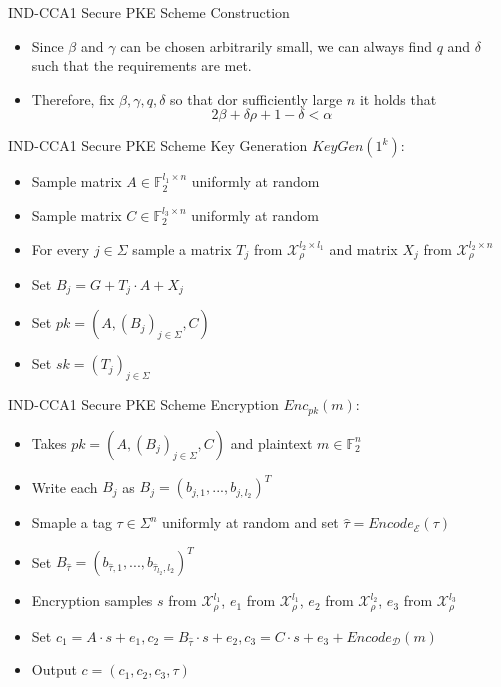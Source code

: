 \documentclass{beamer}
\begin{document}
\begin{frame}{IND-CCA1 Secure PKE Scheme Construction}
  \begin{itemize}
    \item Since $\beta$ and $\gamma$ can be chosen arbitrarily small, we can always find $q$ and $\delta$ such that the requirements are met.
    \item Therefore, fix $\beta, \gamma, q, \delta$ so that dor sufficiently large $n$ it holds that
          $$ 2\beta + \delta \rho + 1 - \delta < \alpha $$
  \end{itemize}
\end{frame}


\begin{frame}{IND-CCA1 Secure PKE Scheme Key Generation}
  $KeyGen(1^k)$:
  \begin{itemize}
    \item Sample matrix $A \in \mathbb{F}_2^{l_1 \times n}$ uniformly at random
    \item Sample matrix $ C \in \mathbb{F}^{l_3 \times n}_2$ uniformly at random
    \item For every $j \in \Sigma$ sample a matrix $T_j$ from $\mathcal{X}_{\rho}^{l_2 \times l_1}$ and matrix $X_j$ from $\mathcal{X}_{\rho}^{l_2 \times n}$
    \item Set $B_j = G + T_j \cdot A + X_j$
    \item Set $pk = (A, (B_j)_{j \in \Sigma}, C)$
    \item Set $sk = (T_j)_{j \in \Sigma}$
  \end{itemize}
\end{frame}

\begin{frame}{IND-CCA1 Secure PKE Scheme Encryption}
  $Enc_{pk}(m)$:
  \begin{itemize}
    \item Takes $pk = (A, (B_j)_{j \in \Sigma}, C)$ and plaintext $m \in \mathbb{F}^n_2$
    \item Write each $B_j$ as $B_j = (b_{j,1},...,b_{j, l_2})^T$
    \item Smaple a tag $\tau \in \Sigma^n$ uniformly at random and set $\hat{\tau} = Encode_{\mathcal{E}}(\tau)$
    \item Set $B_{\hat{\tau}} = (b_{\hat{\tau}, 1}, ... ,b_{\hat{\tau}_{l_2}, l_2})^T$
    \item Encryption samples $s$ from $\mathcal{X}_{\rho}^{l_1}$, $e_1$ from $\mathcal{X}_{\rho}^{l_1}$, $e_2$ from $\mathcal{X}_{\rho}^{l_2}$, $e_3$ from $\mathcal{X}_{\rho}^{l_3}$
    \item Set $c_1 = A \cdot s + e_1, c_2 = B_{\hat{\tau}} \cdot s + e_2, c_3 = C \cdot s + e_3 + Encode_{\mathcal{D}}(m)$
    \item Output $c = (c_1, c_2, c_3, \tau)$
  \end{itemize}
\end{frame}
\end{document}
